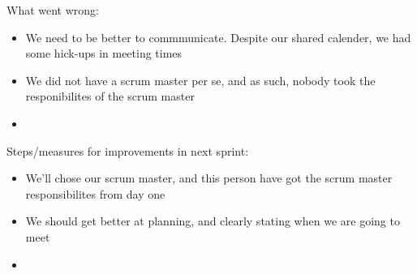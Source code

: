 \documentclass[a4paper,11pt]{article}
\begin{document}
\noindent
What went wrong:
\begin{itemize}
	\item We need to be better to commmunicate. Despite our shared calender, we had some hick-ups in meeting times
	\item We did not have a scrum master per se, and as such, nobody took the responibilites of the scrum master 
	\item 
\end{itemize}

\noindent
Steps/measures for improvements in next sprint:
\begin{itemize}
\item We'll chose our scrum master, and this person have got the scrum master responsibilites from day one
\item We should get better at planning, and clearly stating when we are going to meet
\item 
\end{itemize}
\end{document}
